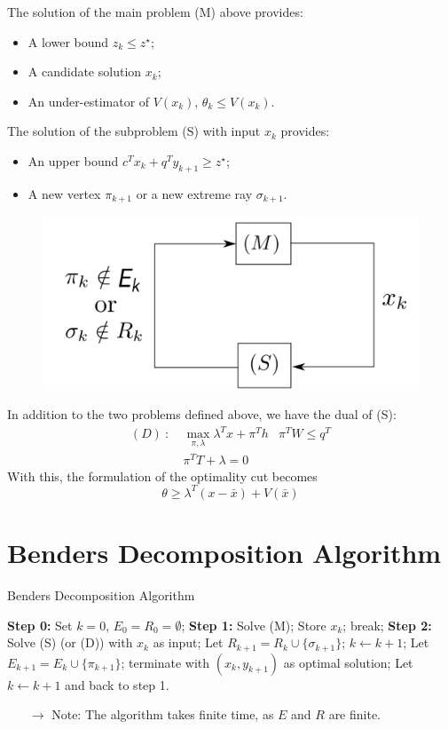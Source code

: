 \documentclass[12pt, openany]{report}
\theoremstyle{definition}
\begin{document}
The solution of the main problem (M) above provides:
\begin{itemize}
	\item A lower bound $z_k\le z^\star$;
	\item A candidate solution $x_k$;
	\item An under-estimator of $V(x_k)$, $\theta_k \le V(x_k)$.
\end{itemize}
The solution of the subproblem (S) with input $x_k$ provides:
\begin{itemize}
	\item An upper bound $c^Tx_k+q^Ty_{k+1}\ge z^\star$;
	\item A new vertex $\pi_{k+1}$ or a new extreme ray $\sigma_{k+1}$.
\end{itemize}
\begin{figure}[H]
	\centering
	\includegraphics[width=.4\textwidth]{img/reformulation.png}
\end{figure}
In addition to the two problems defined above, we have the dual of (S):
\begin{equation}
	\begin{aligned}
		(D) \ : \ & \max_{\pi,\lambda} \lambda^Tx + \pi^Th
		& \pi^TW\le q^T\\
		& \pi^T T + \lambda = 0
	\end{aligned}
\end{equation}
With this, the formulation of the optimality cut becomes 
\begin{equation}
	\theta \ge \lambda^T(x-\bar x) + V(\bar x)
\end{equation}
\section{Benders Decomposition Algorithm}
\begin{algorithm}
	\caption{Benders Decomposition Algorithm}
	\begin{algorithmic}[1]
		\State \textbf{Step 0:} Set $k=0$, $E_0=R_0=\emptyset$;
		\State \textbf{Step 1:} Solve (M);
		\State Store $x_k$;
		\Else \State break;\EndIf
		\State \textbf{Step 2:} Solve (S) (or (D)) with $x_k$ as input;
		\State Let $R_{k+1} = R_k\cup \{\sigma_{k+1}\}$;
		\State $k\gets k+1$;
		\Else \State Let $E_{k+1} = E_k \cup \{\pi_{k+1}\}$;
		 \State terminate with $(x_k,y_{k+1})$ as optimal solution;
		\Else \State Let $k\gets k+1$ and back to step 1.
		\EndIf 
		\EndIf 
	\end{algorithmic}
\end{algorithm}
\begin{itemize}
	\item [$\to$] Note: The algorithm takes finite time, as $E$ and $R$ are finite. 
\end{itemize}
\end{document}
